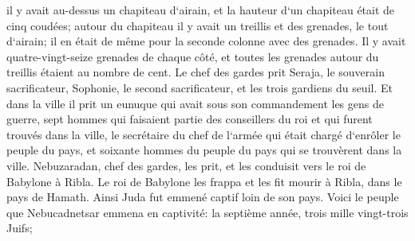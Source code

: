 \verse il y avait au-dessus un chapiteau d`airain, et la hauteur d`un chapiteau était de cinq coudées; autour du chapiteau il y avait un treillis et des grenades, le tout d`airain; il en était de même pour la seconde colonne avec des grenades. 
\verse Il y avait quatre-vingt-seize grenades de chaque côté, et toutes les grenades autour du treillis étaient au nombre de cent. 
\verse Le chef des gardes prit Seraja, le souverain sacrificateur, Sophonie, le second sacrificateur, et les trois gardiens du seuil. 
\verse Et dans la ville il prit un eunuque qui avait sous son commandement les gens de guerre, sept hommes qui faisaient partie des conseillers du roi et qui furent trouvés dans la ville, le secrétaire du chef de l`armée qui était chargé d`enrôler le peuple du pays, et soixante hommes du peuple du pays qui se trouvèrent dans la ville. 
\verse Nebuzaradan, chef des gardes, les prit, et les conduisit vers le roi de Babylone à Ribla. 
\verse Le roi de Babylone les frappa et les fit mourir à Ribla, dans le pays de Hamath. Ainsi Juda fut emmené captif loin de son pays. 
\verse Voici le peuple que Nebucadnetsar emmena en captivité: la septième année, trois mille vingt-trois Juifs; 
